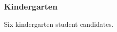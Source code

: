 \documentclass[twoside]{article}
\begin{document}
\subsubsection{Kindergarten}
Six kindergarten student candidates.
%
%
%
%
%
%
%
%
%
\end{document}
